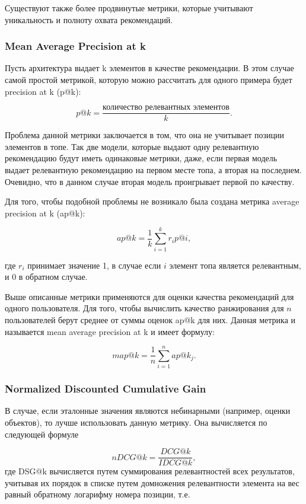 \documentclass[bachelor, och, coursework]{SCWorks}
\begin{document}
Существуют также более продвинутые метрики, которые учитывают уникальность и полноту охвата рекомендаций.

\subsubsection{Mean Average Precision at k}
Пусть архитектура выдает k элементов в качестве рекомендации. В этом случае самой простой метрикой, которую
можно рассчитать для одного примера будет precision at k (p@k):

\begin{equation}
    p@k = \frac{\text{количество релевантных элементов}}{k}.
\end{equation}

Проблема данной метрики заключается в том, что она не учитывает позиции элементов в топе. Так две модели, которые
выдают одну релевантную рекомендацию будут иметь одинаковые метрики, даже, если первая модель выдает релевантную
рекомендацию на первом месте топа, а вторая на последнем. Очевидно, что в данном случае вторая модель проигрывает
первой по качеству.

Для того, чтобы подобной проблемы не возникало была создана метрика average precision at k (ap@k):

\begin{equation}
    ap@k = \frac{1}{k}\sum_{i=1}^{k}r_ip@i,
\end{equation}

где $r_i$ принимает значение 1, в случае если $i$ элемент топа является релевантным, и 0 в обратном случае.

Выше описанные метрики применяются для оценки качества рекомендаций для одного пользователя. Для того, чтобы
вычислить качество ранжирования для $n$ пользователей берут среднее от суммы оценок ap@k для них. Данная метрика
и называется mean average precision at k и имеет формулу:

\begin{equation}
    map@k = \frac{1}{n}\sum_{i=1}^{n}ap@k_j.
\end{equation}

\subsubsection{Normalized Discounted Cumulative Gain}
В случае, если эталонные значения являются небинарными (например, оценки объектов), то лучше использовать
данную метрику. Она вычисляется по следующей формуле

\begin{equation}
    nDCG@k = \frac{DCG@k}{IDCG@k},
\end{equation}
где DSG@k вычисляется путем суммирования релевантностей всех результатов, учитывая их порядок в списке путем домножения релевантности элемента на вес равный обратному логарифму номера позиции, т.е.
\end{document}
